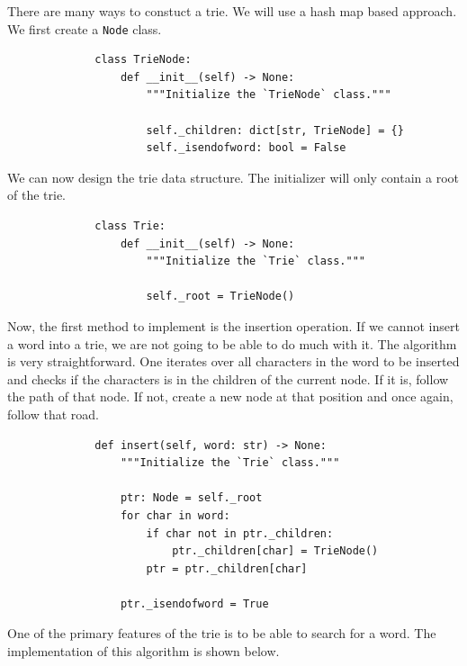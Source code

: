\documentclass[11pt]{article}
\begin{document}
There are many ways to constuct a trie. We will use a hash map based approach.
We first create a \texttt{Node} class.

\begin{figure}[H]
    \centering
    \begin{verbatim}
        class TrieNode:
            def __init__(self) -> None:
                """Initialize the `TrieNode` class."""

                self._children: dict[str, TrieNode] = {}
                self._isendofword: bool = False
    \end{verbatim}
\end{figure}

We can now design the trie data structure. The initializer will only contain a
root of the trie.

\begin{figure}[H]
    \centering
    \begin{verbatim}
        class Trie:
            def __init__(self) -> None:
                """Initialize the `Trie` class."""

                self._root = TrieNode()
    \end{verbatim}
\end{figure}

Now, the first method to implement is the insertion operation. If we cannot
insert a word into a trie, we are not going to be able to do much with it. The
algorithm is very straightforward. One iterates over all characters in the word
to be inserted and checks if the characters is in the children of the current
node. If it is, follow the path of that node. If not, create a new node at that
position and once again, follow that road.

\begin{figure}[H]
    \centering
    \begin{verbatim}
        def insert(self, word: str) -> None:
            """Initialize the `Trie` class."""

            ptr: Node = self._root
            for char in word:
                if char not in ptr._children:
                    ptr._children[char] = TrieNode()
                ptr = ptr._children[char]

            ptr._isendofword = True
    \end{verbatim}
\end{figure}

One of the primary features of the trie is to be able to search for a word.
The implementation of this algorithm is shown below.
\end{document}
